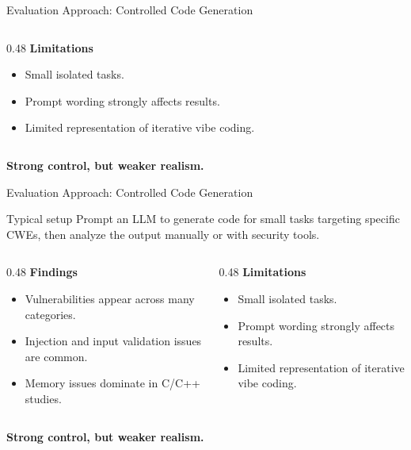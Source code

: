 \begin{frame}{Evaluation Approach: Controlled Code Generation}
\begin{columns}[T]
    \begin{column}{0.48\textwidth}
    \textbf{Limitations}
    \begin{itemize}
        \item Small isolated tasks.
        \item Prompt wording strongly affects results.
        \item Limited representation of iterative vibe coding.
    \end{itemize}
    \end{column}
    \end{columns}
    
    \bigskip
    \centering
    \textbf{Strong control, but weaker realism.}

\end{frame}


\begin{frame}{Evaluation Approach: Controlled Code Generation}
    
    \begin{block}{Typical setup}
    Prompt an LLM to generate code for small tasks targeting specific CWEs, then analyze the output manually or with security tools.
    \end{block}
    
    \medskip
    
    \begin{columns}[T]
    \begin{column}{0.48\textwidth}
    \textbf{Findings}
    \begin{itemize}
        \item Vulnerabilities appear across many categories.
        \item Injection and input validation issues are common.
        \item Memory issues dominate in C/C++ studies.
    \end{itemize}
    \end{column}
    
    \begin{column}{0.48\textwidth}
    \textbf{Limitations}
    \begin{itemize}
        \item Small isolated tasks.
        \item Prompt wording strongly affects results.
        \item Limited representation of iterative vibe coding.
    \end{itemize}
    \end{column}
    \end{columns}
    
    \bigskip
    \centering
    \textbf{Strong control, but weaker realism.}

\end{frame}

